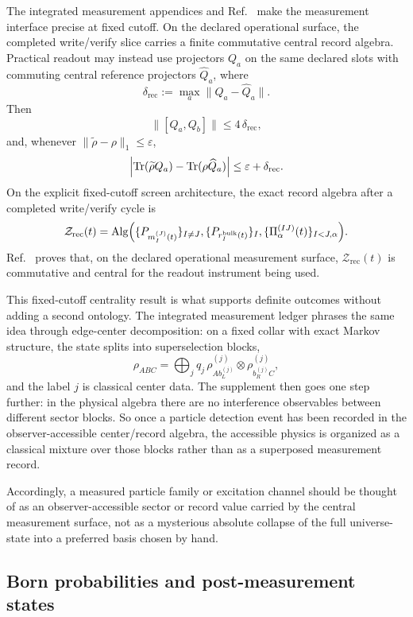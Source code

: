 \documentclass[11pt]{article}
\begin{document}
The integrated measurement appendices and Ref.~\cite{ophmicrophysics} make the measurement
interface precise at fixed cutoff. On the declared operational surface, the completed
write/verify slice carries a finite commutative central record algebra. Practical readout may
instead use projectors \(Q_a\) on the same declared slots with commuting central reference
projectors \(\widehat Q_a\), where
\[
\delta_{\mathrm{rec}}:=\max_a \|Q_a-\widehat Q_a\|.
\]
Then
\[
\|[Q_a,Q_b]\|\le 4\,\delta_{\mathrm{rec}},
\]
and, whenever \(\|\widetilde\rho-\rho\|_1\le\varepsilon\),
\[
\Bigl|
\operatorname{Tr}(\widetilde\rho Q_a)-\operatorname{Tr}(\rho \widehat Q_a)
\Bigr|
\le
\varepsilon+\delta_{\mathrm{rec}}.
\]
On the explicit fixed-cutoff screen architecture, the exact record algebra after a completed
write/verify cycle is
\[
\mathcal Z_{\mathrm{rec}}(t)
=
\mathrm{Alg}\Bigl(
\{P_{m_I^{(J)}(t)}\}_{I\neq J},
\{P_{r_I^{\mathrm{bulk}}(t)}\}_I,
\{\Pi_\alpha^{(IJ)}(t)\}_{I<J,\alpha}
\Bigr).
\]
Ref.~\cite{ophmicrophysics} proves that, on the declared operational measurement surface,
\(\mathcal Z_{\mathrm{rec}}(t)\) is commutative and central for the readout instrument being
used.

This fixed-cutoff centrality result is what supports definite outcomes without adding a second
ontology. The integrated measurement ledger phrases the same idea through edge-center
decomposition: on a fixed collar with exact Markov structure, the state splits into
superselection blocks,
\[
\rho_{ABC}
=
\bigoplus_j
q_j\,
\rho^{(j)}_{A b_L^{(j)}}\otimes \rho^{(j)}_{b_R^{(j)} C},
\]
and the label \(j\) is classical center data. The supplement then goes one step further: in the
physical algebra there are no interference observables between different sector blocks. So once a
particle detection event has been recorded in the observer-accessible center/record algebra, the
accessible physics is organized as a classical mixture over those blocks rather than as a
superposed measurement record.

Accordingly, a measured particle family or excitation channel should be
thought of as an observer-accessible sector or record value carried by the central measurement
surface, not as a mysterious absolute collapse of the full universe-state into a preferred basis
chosen by hand.

\subsection{Born probabilities and post-measurement states}
\end{document}
